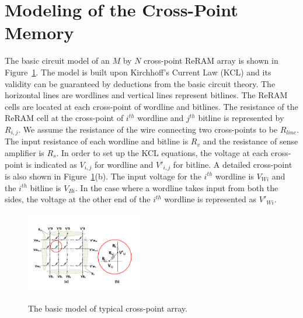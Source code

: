 \section{Modeling of the Cross-Point Memory}\label{sec:model}


The basic circuit model of an $M$ by $N$ cross-point ReRAM array is shown
in Figure~\ref{fig:modeling}. The model is built upon Kirchhoff's Current
Law (KCL) and its validity can be guaranteed by deductions from the basic
circuit theory. The horizontal lines are wordlines and vertical lines
represent bitlines. The ReRAM cells are located at each cross-point of
wordline and bitlines. The resistance of the ReRAM cell at the cross-point
of $i^{th}$ wordline and $j^{th}$ bitline is represented by $R_{i,j}$. We
assume the resistance of the wire connecting two cross-points to be
$R_{line}$. The input resistance of each wordline and bitline is $R_v$ and
the resistance of sense amplifier is $R_s$. In order to set up the KCL
equations, the voltage at each cross-point is indicated as $V_{i,j}$ for
wordline and $V'_{i,j}$ for bitline. A detailed cross-point is also shown
in Figure~\ref{fig:modeling}(b). The input voltage for the $i^{th}$
wordline is $V_{Wi}$ and the $i^{th}$ bitline is $V_{Bi}$. In the case
where a wordline takes input from both the sides, the voltage at the other
end of the $i^{th}$ wordline is represented as $V'_{Wi}$.

\begin{figure}%
\centering
  \includegraphics[width=0.45\textwidth]{./figures/model_f.pdf}\\
  \caption{The basic model of typical cross-point array.}\label{fig:modeling}
  \vspace{-12pt}
\end{figure}

